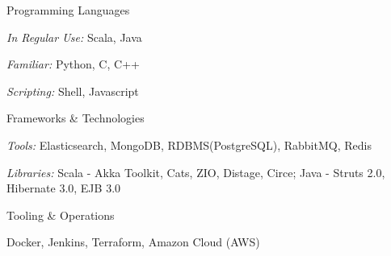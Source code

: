 

\begin{cvskills}

  \cvskill
  {Programming Languages} %
  {
  \begin{cvskillsitems} %
    \item {\emph{In Regular Use:} Scala, Java} %
    \item {\emph{Familiar:} Python, C, C++} %
    \item {\emph{Scripting:} Shell, Javascript} %
  \end{cvskillsitems}
  }

  \cvskill
  {Frameworks \& Technologies} %
  {
  \begin{cvskillsitems} %
    \item {\emph{Tools:} Elasticsearch, MongoDB, RDBMS(PostgreSQL), RabbitMQ, Redis} %
    \item {\emph{Libraries:} Scala - Akka Toolkit, Cats, ZIO, Distage, Circe; Java - Struts 2.0, Hibernate 3.0, EJB 3.0} %
  \end{cvskillsitems}
  }


  \cvskill
  {Tooling \& Operations} %
  {
  \begin{cvskillsitems} %
    \item {Docker, Jenkins, Terraform, Amazon Cloud (AWS)} %
  \end{cvskillsitems}
  }

\end{cvskills}
